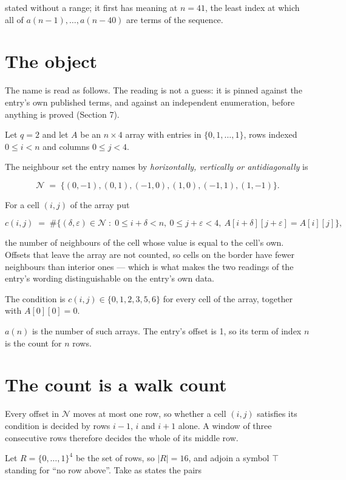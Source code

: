 \documentclass[11pt]{article}
\theoremstyle{definition}
\begin{document}
stated without a range; it first has meaning at $n = 41$, the least index at which all of $a(n-1),\dots,a(n-40)$ are terms of the sequence.

\section{The object}

The name is read as follows. The reading is not a guess: it is pinned against the entry's own published terms, and against an independent enumeration, before anything is proved (Section 7).

Let $q = 2$ and let $A$ be an $n \times 4$ array with entries in $\{0,1,\dots,1\}$, rows indexed $0 \le i < n$ and columns $0 \le j < 4$.

The neighbour set the entry names by {\itshape horizontally, vertically or antidiagonally} is

\[\mathcal{N} \;=\; \{(0,-1), (0,1), (-1,0), (1,0), (-1,1), (1,-1)\}.\]

For a cell $(i,j)$ of the array put

\[c(i,j) \;=\; \#\bigl\{(\delta,\varepsilon)\in\mathcal{N} \;:\; 0\le i+\delta<n,\ 0\le j+\varepsilon<4,\ A[i+\delta][j+\varepsilon] = A[i][j]\bigr\},\]

the number of neighbours of the cell whose value is equal to the cell's own. Offsets that leave the array are not counted, so cells on the border have fewer neighbours than interior ones --- which is what makes the two readings of the entry's wording distinguishable on the entry's own data.

The condition is $c(i,j) \in \{0, 1, 2, 3, 5, 6\}$ for every cell of the array, together with $A[0][0]=0$.

$a(n)$ is the number of such arrays. The entry's offset is 1, so its term of index $n$ is the count for $n$ rows.

\section{The count is a walk count}

Every offset in $\mathcal{N}$ moves at most one row, so whether a cell $(i,j)$ satisfies its condition is decided by rows $i-1$, $i$ and $i+1$ alone. A window of three consecutive rows therefore decides the whole of its middle row.

Let $R = \{0,\dots,1\}^{4}$ be the set of rows, so $|R| = 16$, and adjoin a symbol $\top$ standing for ``no row above''. Take as states the pairs
\end{document}
